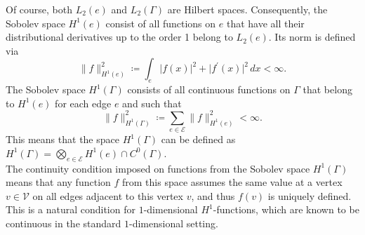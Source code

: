 Of course, both $L_2(e)$ and $L_2(\Gamma)$ are Hilbert spaces. Consequently, the Sobolev space $H^1 (e)$ consist of all functions on $e$ that have all their distributional derivatives up to the order 1 belong to $L_2(e)$. Its norm is defined via
\begin{equation*}
    \lVert f \rVert^{2}_{H^1(e)} \coloneqq \int_e \lvert f(x) \rvert^2 + \lvert f^{\prime}(x) \rvert^2 \, dx < \infty.
\end{equation*}
The Sobolev space $H^1 (\Gamma)$ consists of all continuous functions on $\Gamma$ that belong to $H^1 (e)$ for each edge $e$ and such that 
\begin{equation*} 
    \lVert f \rVert^{2}_{H^1 (\Gamma)} \coloneqq \sum_{e \in \mathcal{E}} \lVert f \rVert^{2}_{H^1 (e)} < \infty.
\end{equation*}
This means that the space $H^1 (\Gamma)$ can be defined as $H^1 (\Gamma) =  \bigotimes_{e \in \mathcal{E}} H^1 (e) \cap C^{0}(\Gamma)$.\\
The continuity condition imposed on functions from the Sobolev space $H^1 (\Gamma)$ means that any function $f$ from this space assumes the same value at a vertex $v \in \mathcal{V}$ on all edges adjacent to this vertex $v$, and thus $f(v)$ is uniquely defined. This is a natural condition for $1$-dimensional $H^1$-functions, which are known to be continuous in the standard $1$-dimensional setting. \\

